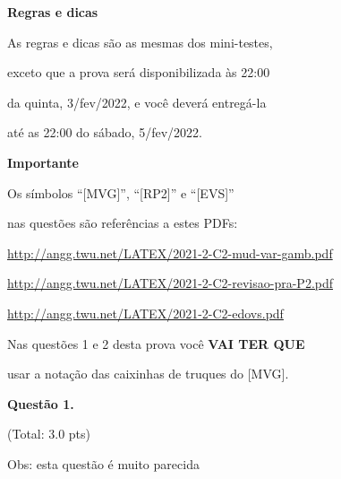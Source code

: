 \documentclass[oneside,12pt]{article}
\begin{document}
{\bf Regras e dicas}

As regras e dicas são as mesmas dos mini-testes,

exceto que a prova será disponibilizada às 22:00

da quinta, 3/fev/2022, e você deverá entregá-la

até as 22:00 do sábado, 5/fev/2022.



\bsk

\newpage

{\bf Importante}

\ssk

Os símbolos ``[MVG]'', ``[RP2]'' e ``[EVS]''

nas questões são referências a estes PDFs:

\ssk

{\footnotesize

\url{http://angg.twu.net/LATEX/2021-2-C2-mud-var-gamb.pdf}

\url{http://angg.twu.net/LATEX/2021-2-C2-revisao-pra-P2.pdf}

\url{http://angg.twu.net/LATEX/2021-2-C2-edovs.pdf}

}

\bsk

Nas questões 1 e 2 desta prova você {\bf VAI TER QUE}

usar a notação das caixinhas de truques do [MVG].




% 
% 
% 


\newpage


{\bf Questão 1.}

\T(Total: 3.0 pts)

Obs: esta questão é muito parecida
\end{document}
